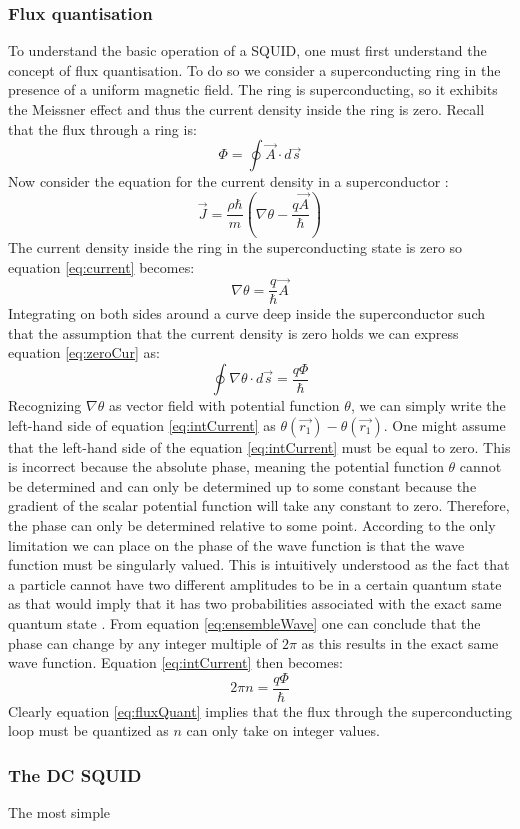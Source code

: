 \subsubsection*{Flux quantisation}
To understand the basic operation of a SQUID, one must first understand the concept of flux quantisation. To do so we consider a superconducting ring in the presence of a uniform magnetic field. The ring is superconducting, so it exhibits the Meissner effect and thus the current density inside the ring is zero. Recall that the flux through a ring is:
\begin{equation}
    \Phi = \oint \Vec{A} \cdot d\Vec{s}
\end{equation}
Now consider the equation for the current density in a superconductor \cite{Feynman_Leighton_Sands_2013}: 
\begin{equation}
    \Vec{J} = \frac{\rho\hbar}{m}(\nabla\theta - \frac{q\Vec{A}}{\hbar})
    \label{eq:current}
\end{equation}
The current density inside the ring in the superconducting state is zero so equation \ref{eq:current} becomes:
\begin{equation}
    \nabla\theta = \frac{q}{\hbar}\Vec{A}
    \label{eq:zeroCur}
\end{equation}
Integrating on both sides around a curve deep inside the superconductor such that the assumption that the current density is zero holds we can express equation \ref{eq:zeroCur} as:
\begin{equation}
    \oint\nabla\theta\cdot d\Vec{s} = \frac{q\Phi}{\hbar}
    \label{eq:intCurrent}
\end{equation}
Recognizing $\nabla\theta$ as vector field with potential function $\theta$, we can simply write the left-hand side of equation \ref{eq:intCurrent} as $\theta(\Vec{r_1}) - \theta(\Vec{r_1})$. One might assume that the left-hand side of the equation \ref{eq:intCurrent} must be equal to zero. This is incorrect because the absolute phase, meaning the potential function $\theta$ cannot be determined and can only be determined up to some constant because the gradient of the scalar potential function will take any constant to zero. Therefore, the phase can only be determined relative to some point. According to \cite{Feynman_Leighton_Sands_2013} the only limitation we can place on the phase of the wave function is that the wave function must be singularly valued. This is intuitively understood as the fact that a particle cannot have two different amplitudes to be in a certain quantum state as that would imply that it has two probabilities associated with the exact same quantum state \cite{Feynman_Leighton_Sands_2013}. From equation \ref{eq:ensembleWave} one can conclude that the phase can change by any integer multiple of $2\pi$ as this results in the exact same wave function. Equation \ref{eq:intCurrent} then becomes:
\begin{equation}
    2\pi n = \frac{q\Phi}{\hbar}
    \label{eq:fluxQuant}
\end{equation}
Clearly equation \ref{eq:fluxQuant} implies that the flux through the superconducting loop must be quantized as $n$ can only take on integer values.

\subsubsection*{The DC SQUID}
The most simple 